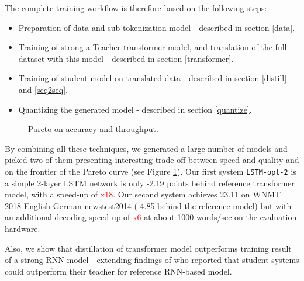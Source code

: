 \documentclass[11pt,a4paper]{article}
\begin{document}
The complete training workflow is therefore based on the following steps:
\begin{itemize}
\item Preparation of data and sub-tokenization model - described in section \ref{data}.
\item Training of strong a Teacher transformer model, and translation of the full dataset with this model - described in section \ref{transformer}.
\item Training of student model on translated data - described in section \ref{distill} and \ref{seq2seq}.
\item Quantizing the generated model - described in section \ref{quantize}.
\end{itemize}

\begin{figure}
\caption{Pareto on accuracy and throughput.}
\label{fig:pareto}
\end{figure}

By combining all these techniques, we generated a large number of models and picked two of them presenting interesting trade-off between speed and quality and on the frontier of the Pareto curve (see Figure \ref{fig:pareto}). Our first system {\tt LSTM-opt-2} is a simple 2-layer LSTM network is only -2.19 points behind reference transformer model, with a speed-up of \textcolor{red}{x18}. Our second system achieves 23.11 on WNMT 2018 English-German newstest2014 (-4.85 behind the reference model) but  with an additional decoding speed-up of \textcolor{red}{x6} at about 1000 words/sec on the evaluation hardware.

Also, we show that distillation of transformer model outperforms training result of a strong RNN model - extending findings of \cite{DBLP:journals/corr/CregoS16} who reported that student systems could outperform their teacher for reference RNN-based model.
\end{document}
